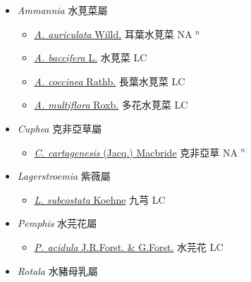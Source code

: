 
  \begin{itemize}
 \item[] \textit{Ammannia} 水莧菜屬
                    
  \begin{itemize}
        \item[] \href{http://www.theplantlist.org/tpl1.1/search?q=Ammannia+auriculata}{\textit{A. auriculata} Willd.}   耳葉水莧菜 NA $^n$
        \item[] \href{http://www.theplantlist.org/tpl1.1/search?q=Ammannia+baccifera}{\textit{A. baccifera} L.}   水莧菜 LC
        \item[] \href{http://www.theplantlist.org/tpl1.1/search?q=Ammannia+coccinea}{\textit{A. coccinea} Rathb.}   長葉水莧菜 LC
        \item[] \href{http://www.theplantlist.org/tpl1.1/search?q=Ammannia+multiflora}{\textit{A. multiflora} Roxb.}   多花水莧菜 LC
  \end{itemize}
 \item[] \textit{Cuphea} 克非亞草屬
                    
  \begin{itemize}
        \item[] \href{http://www.theplantlist.org/tpl1.1/search?q=Cuphea+cartagenesis}{\textit{C. cartagenesis} (Jacq.) Macbride}   克非亞草 NA $^n$
  \end{itemize}
 \item[] \textit{Lagerstroemia} 紫薇屬
                    
  \begin{itemize}
        \item[] \href{http://www.theplantlist.org/tpl1.1/search?q=Lagerstroemia+subcostata}{\textit{L. subcostata} Koehne}   九芎 LC
  \end{itemize}
 \item[] \textit{Pemphis} 水芫花屬
                    
  \begin{itemize}
        \item[] \href{http://www.theplantlist.org/tpl1.1/search?q=Pemphis+acidula}{\textit{P. acidula} J.R.Forst. \& G.Forst.}   水芫花 LC
  \end{itemize}
 \item[] \textit{Rotala} 水豬母乳屬
                    

\end{itemize}
